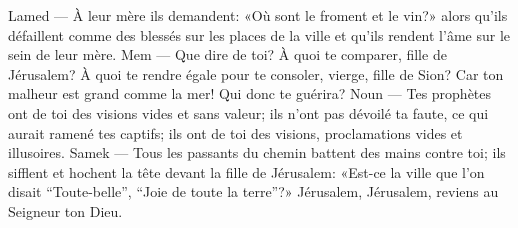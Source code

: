 Lamed --- À leur mère ils demandent: «Où sont le froment et le vin?»
	alors qu’ils défaillent comme des blessés sur les places de la ville
	et qu’ils rendent l’âme sur le sein de leur mère.
Mem --- Que dire de toi? À quoi te comparer, fille de Jérusalem?
	À quoi te rendre égale pour te consoler, vierge, fille de Sion?
	Car ton malheur est grand comme la mer! Qui donc te guérira?
Noun --- Tes prophètes ont de toi des visions vides et sans valeur;
	ils n’ont pas dévoilé ta faute, ce qui aurait ramené tes captifs;
	ils ont de toi des visions, proclamations vides et illusoires.
Samek --- Tous les passants du chemin battent des mains contre toi;
	ils sifflent et hochent la tête devant la fille de Jérusalem:
	«Est-ce la ville que l’on disait “Toute-belle”, “Joie de toute la terre”?»
Jérusalem, Jérusalem, reviens au Seigneur ton Dieu.
